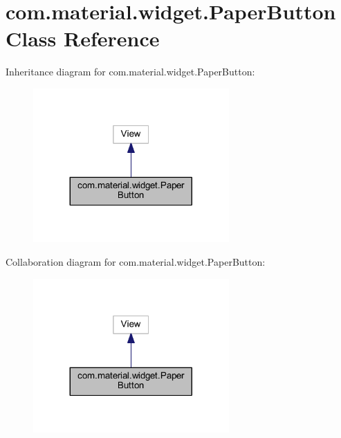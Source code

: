 \hypertarget{classcom_1_1material_1_1widget_1_1_paper_button}{}\section{com.\+material.\+widget.\+Paper\+Button Class Reference}
\label{classcom_1_1material_1_1widget_1_1_paper_button}


Inheritance diagram for com.\+material.\+widget.\+Paper\+Button\+:
\nopagebreak
\begin{figure}[H]
\begin{center}
\leavevmode
\includegraphics[width=212pt]{classcom_1_1material_1_1widget_1_1_paper_button__inherit__graph}
\end{center}
\end{figure}


Collaboration diagram for com.\+material.\+widget.\+Paper\+Button\+:
\nopagebreak
\begin{figure}[H]
\begin{center}
\leavevmode
\includegraphics[width=212pt]{classcom_1_1material_1_1widget_1_1_paper_button__coll__graph}
\end{center}
\end{figure}
